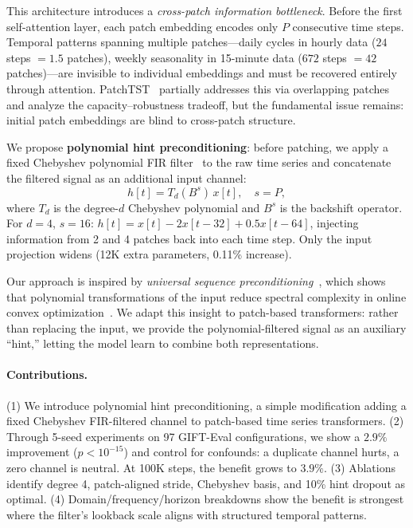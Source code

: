 \documentclass{article}
\begin{document}
This architecture introduces a \emph{cross-patch information bottleneck}. Before the first self-attention layer, each patch embedding encodes only $P$ consecutive time steps. Temporal patterns spanning multiple patches---daily cycles in hourly data ($24$ steps $= 1.5$ patches), weekly seasonality in 15-minute data ($672$ steps $= 42$ patches)---are invisible to individual embeddings and must be recovered entirely through attention. PatchTST~\citep{nie2023patchtst} partially addresses this via overlapping patches and \citet{han2024capacity} analyze the capacity--robustness tradeoff, but the fundamental issue remains: initial patch embeddings are blind to cross-patch structure.

We propose \textbf{polynomial hint preconditioning}: before patching, we apply a fixed Chebyshev polynomial FIR filter~\citep{oppenheim1999discrete} to the raw time series and concatenate the filtered signal as an additional input channel:
\begin{equation}
h[t] = T_d(B^s) \, x[t], \quad s = P,
\label{eq:hint}
\end{equation}
where $T_d$ is the degree-$d$ Chebyshev polynomial and $B^s$ is the backshift operator. For $d{=}4$, $s{=}16$: $h[t] = x[t] - 2 x[t{-}32] + 0.5 x[t{-}64]$, injecting information from 2 and 4 patches back into each time step. Only the input projection widens (12K extra parameters, 0.11\% increase).

Our approach is inspired by \emph{universal sequence preconditioning}~\citep{marsden2024universal}, which shows that polynomial transformations of the input reduce spectral complexity in online convex optimization~\citep{hazan2016introduction}. We adapt this insight to patch-based transformers: rather than replacing the input, we provide the polynomial-filtered signal as an auxiliary ``hint,'' letting the model learn to combine both representations.

\paragraph{Contributions.}
(1) We introduce polynomial hint preconditioning, a simple modification adding a fixed Chebyshev FIR-filtered channel to patch-based time series transformers.
(2) Through 5-seed experiments on 97 GIFT-Eval configurations, we show a $2.9\%$ improvement ($p < 10^{-15}$) and control for confounds: a duplicate channel hurts, a zero channel is neutral. At 100K steps, the benefit grows to $3.9\%$.
(3) Ablations identify degree 4, patch-aligned stride, Chebyshev basis, and 10\% hint dropout as optimal.
(4) Domain/frequency/horizon breakdowns show the benefit is strongest where the filter's lookback scale aligns with structured temporal patterns.
\end{document}
